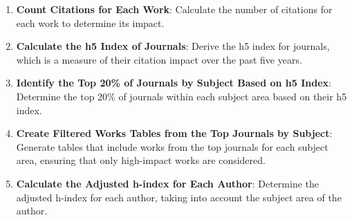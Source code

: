 \begin{enumerate}
      \item \textbf{Count Citations for Each Work}: Calculate the number of citations for each work to determine its impact.

      \item \textbf{Calculate the h5 Index of Journals}: Derive the h5 index for journals, which is a
            measure of their citation impact over the past five years.

      \item \textbf{Identify the Top 20\% of Journals by Subject Based on h5 Index}: Determine the top 20\% of journals within
            each subject area based on their h5 index.

      \item \textbf{Create Filtered Works Tables from the Top Journals by Subject}: Generate tables that include works from the
            top journals for each subject area, ensuring that only high-impact works are considered.

      \item \textbf{Calculate the Adjusted h-index for Each Author}: Determine the adjusted h-index for each author,
            taking into account the subject area of the author.
\end{enumerate}

